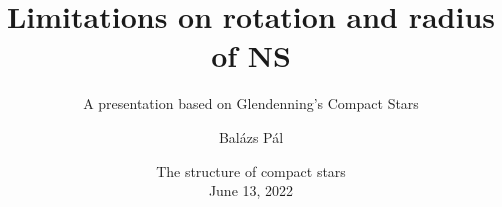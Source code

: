 \title[Limitations on rotation and radius of NS]
{Limitations on rotation and radius of NS}
\subtitle{A presentation based on Glendenning's Compact Stars}

\author[Balázs Pál]
{Balázs Pál}


\date[ELTE 2022]
{The structure of compact stars\\June 13, 2022}

